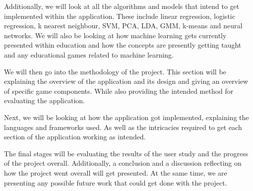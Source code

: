 		Additionally, we will look at all the algorithms and models that intend to get implemented within the application. These include linear regression, logistic regression, k nearest neighbour, SVM, PCA, LDA, GMM, k-means and neural networks. We will also be looking at how machine learning gets currently presented within education and how the concepts are presently getting taught and any educational games related to machine learning.
		
		We will then go into the methodology of the project. This section will be explaining the overview of the application and its design and giving an overview of specific game components. While also providing the intended method for evaluating the application.
		
		Next, we will be looking at how the application got implemented, explaining the languages and frameworks used. As well as the intricacies required to get each section of the application working as intended. 
		
		The final stages will be evaluating the results of the user study and the progress of the project overall. Additionally, a conclusion and a discussion reflecting on how the project went overall will get presented. At the same time, we are presenting any possible future work that could get done with the project.
	
	